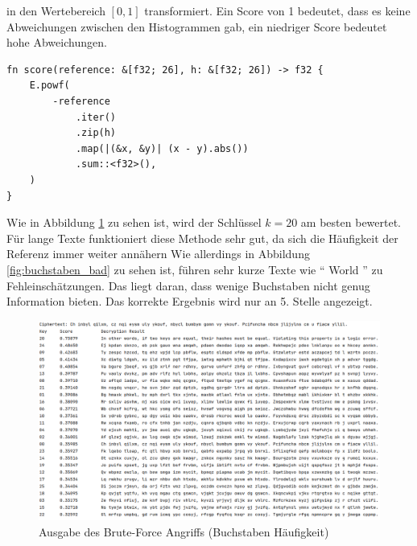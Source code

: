 \documentclass{article}
\begin{document}
    in den Wertebereich $\left[0,1\right]$ transformiert. Ein Score von 1 bedeutet,
    dass es keine Abweichungen zwischen den Histogrammen gab, ein niedriger Score bedeutet
    hohe Abweichungen.
    \begin{verbatim}
fn score(reference: &[f32; 26], h: &[f32; 26]) -> f32 {
    E.powf(
        -reference
            .iter()
            .zip(h)
            .map(|(&x, &y)| (x - y).abs())
            .sum::<f32>(),
    )
}
    \end{verbatim}
    Wie in Abbildung \ref{fig:buchstaben_haufigkeit} zu sehen ist, wird der Schlüssel $k=20$ am besten bewertet.
    Für lange Texte funktioniert diese Methode sehr gut, da sich die Häufigkeit der Referenz immer weiter annähern
    Wie allerdings in Abbildung \ref{fig:buchstaben_bad} zu sehen ist, führen sehr kurze Texte wie "` World "' zu 
    Fehleinschätzungen. Das liegt daran, dass wenige Buchstaben nicht genug Information bieten. Das korrekte
    Ergebnis wird nur an 5. Stelle angezeigt.
    \begin{figure}
        \includegraphics[width=\textwidth]{text_results/console_out2.png}
        \caption{Ausgabe des Brute-Force Angriffs (Buchstaben Häufigkeit)}
        \label{fig:buchstaben_haufigkeit}
    \end{figure}
\end{document}

